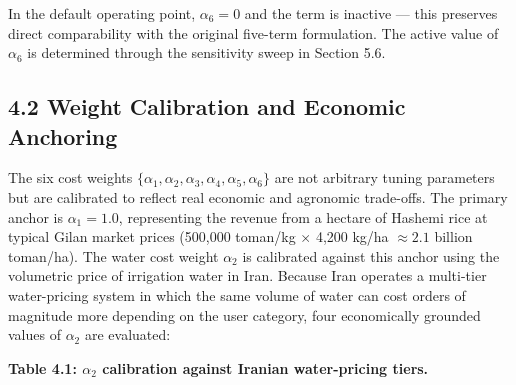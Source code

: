 In the default operating point, \(\alpha_6 = 0\) and the term is
inactive --- this preserves direct comparability with the original
five-term formulation. The active value of \(\alpha_6\) is determined
through the sensitivity sweep in Section 5.6.

\subsection{4.2 Weight Calibration and Economic
Anchoring}\label{weight-calibration-and-economic-anchoring}

The six cost weights
\(\{\alpha_1, \alpha_2, \alpha_3, \alpha_4, \alpha_5, \alpha_6\}\) are
not arbitrary tuning parameters but are calibrated to reflect real
economic and agronomic trade-offs. The primary anchor is
\(\alpha_1 = 1.0\), representing the revenue from a hectare of Hashemi
rice at typical Gilan market prices (500,000 toman/kg \(\times\) 4,200
kg/ha \(\approx 2.1\) billion toman/ha). The water cost weight
\(\alpha_2\) is calibrated against this anchor using the volumetric
price of irrigation water in Iran. Because Iran operates a multi-tier
water-pricing system in which the same volume of water can cost orders
of magnitude more depending on the user category, four economically
grounded values of \(\alpha_2\) are evaluated:

\textbf{Table 4.1: \(\alpha_2\) calibration against Iranian
water-pricing tiers.}

